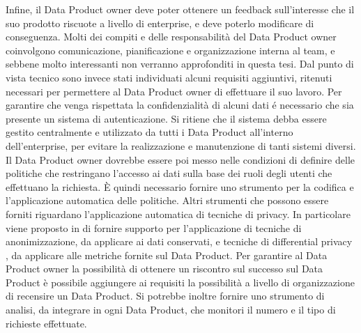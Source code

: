 \documentclass[a4paper,12pt]{report}
\begin{document}
Infine, il Data Product owner deve poter ottenere un feedback sull'interesse che il suo prodotto riscuote a livello di enterprise, e deve poterlo modificare di conseguenza.
Molti dei compiti e delle responsabilità del Data Product owner coinvolgono comunicazione, pianificazione e organizzazione interna al team, e sebbene molto interessanti non verranno approfonditi in questa tesi.
Dal punto di vista tecnico sono invece stati individuati alcuni requisiti aggiuntivi, ritenuti necessari per permettere al Data Product owner di effettuare il suo lavoro.
Per garantire che venga rispettata la confidenzialità di alcuni dati é necessario che sia presente un sistema di autenticazione.
Si ritiene che il sistema debba essere gestito centralmente e utilizzato da tutti i Data Product all'interno dell'enterprise, per evitare la realizzazione e manutenzione di tanti sistemi diversi. 
Il Data Product owner dovrebbe essere poi messo nelle condizioni di definire delle politiche che restringano l'accesso ai dati sulla base dei ruoli degli utenti che effettuano la richiesta.
È quindi necessario fornire uno strumento per la codifica e l'applicazione automatica delle politiche.
Altri strumenti che possono essere forniti riguardano l'applicazione automatica di tecniche di privacy. 
In particolare  viene proposto in \cite{dehghani_data_2022} di fornire supporto per l'applicazione di tecniche di anonimizzazione, da applicare ai dati conservati, e tecniche di differential privacy \cite{dwork2006differential}, da applicare alle metriche fornite sul Data Product.
Per garantire al Data Product owner la possibilità di ottenere un riscontro sul successo sul Data Product è possibile aggiungere ai requisiti la possibilità a livello di organizzazione di recensire un Data Product. 
Si potrebbe inoltre fornire uno strumento di analisi, da integrare in ogni Data Product, che monitori il numero e il tipo di richieste effettuate.
\end{document}
